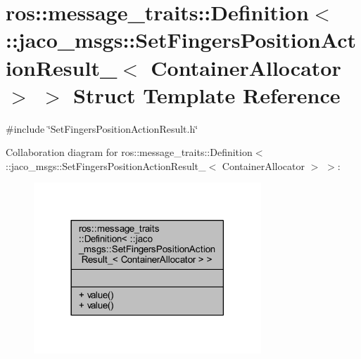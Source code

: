 \hypertarget{structros_1_1message__traits_1_1Definition_3_01_1_1jaco__msgs_1_1SetFingersPositionActionResult_d77f823cc2975df7a63f01b98938519f}{}\section{ros\+:\+:message\+\_\+traits\+:\+:Definition$<$ \+:\+:jaco\+\_\+msgs\+:\+:Set\+Fingers\+Position\+Action\+Result\+\_\+$<$ Container\+Allocator $>$ $>$ Struct Template Reference}
\label{structros_1_1message__traits_1_1Definition_3_01_1_1jaco__msgs_1_1SetFingersPositionActionResult_d77f823cc2975df7a63f01b98938519f}


{\ttfamily \#include \char`\"{}Set\+Fingers\+Position\+Action\+Result.\+h\char`\"{}}



Collaboration diagram for ros\+:\+:message\+\_\+traits\+:\+:Definition$<$ \+:\+:jaco\+\_\+msgs\+:\+:Set\+Fingers\+Position\+Action\+Result\+\_\+$<$ Container\+Allocator $>$ $>$\+:
\nopagebreak
\begin{figure}[H]
\begin{center}
\leavevmode
\includegraphics[width=242pt]{d2/de4/structros_1_1message__traits_1_1Definition_3_01_1_1jaco__msgs_1_1SetFingersPositionActionResult_44acb9f33a7604a02ca2fb9524670321}
\end{center}
\end{figure}
